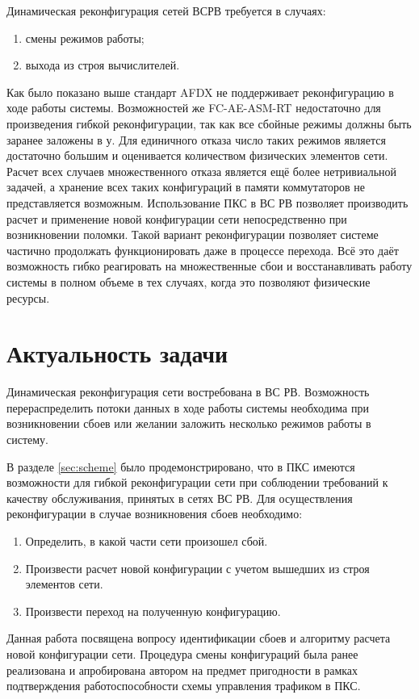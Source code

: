 \documentclass[12pt, a4paper]{article}
\begin{document}
Динамическая реконфигурация сетей ВСРВ требуется в случаях:
\begin{enumerate}
	\item смены режимов работы;
	\item выхода из строя вычислителей.
\end{enumerate}

Как было показано выше стандарт AFDX не поддерживает реконфигурацию в ходе работы системы. Возможностей же FC-AE-ASM-RT недостаточно для произведения гибкой реконфигурации, так как все сбойные режимы должны быть заранее заложены в у. Для единичного отказа число таких режимов является достаточно большим и оценивается количеством физических элементов сети. Расчет всех случаев множественного отказа является ещё более нетривиальной задачей, а хранение всех таких конфигураций в памяти коммутаторов не представляется возможным. Использование ПКС в ВС РВ позволяет производить расчет и применение новой конфигурации сети непосредственно при возникновении поломки. Такой вариант реконфигурации позволяет системе частично продолжать функционировать даже в процессе перехода. Всё это даёт возможность гибко реагировать на множественные сбои и восстанавливать работу системы в полном объеме в тех случаях, когда это позволяют физические ресурсы.


\section{Актуальность задачи}
Динамическая реконфигурация сети востребована в ВС РВ. Возможность перераспределить потоки данных в ходе работы системы необходима при возникновении сбоев или желании заложить несколько режимов работы в систему.

В разделе \ref{sec:scheme} было продемонстрировано, что в ПКС имеются возможности для гибкой реконфигурации сети при соблюдении требований к качеству обслуживания, принятых в сетях ВС РВ. Для осуществления реконфигурации в случае возникновения сбоев необходимо:
\begin{enumerate}
	\item Определить, в какой части сети произошел сбой.
	\item Произвести расчет новой конфигурации с учетом вышедших из строя элементов сети.
	\item Произвести переход на полученную конфигурацию.
\end{enumerate}

Данная работа посвящена вопросу идентификации сбоев и алгоритму расчета новой конфигурации сети. Процедура смены конфигураций была ранее реализована и апробирована автором на предмет пригодности в рамках подтверждения работоспособности схемы управления трафиком в ПКС.
\end{document}
